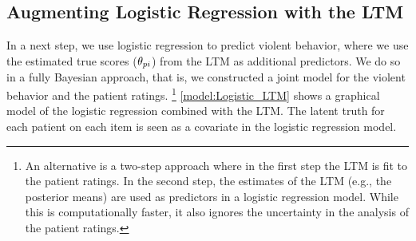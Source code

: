 \documentclass[a4paper,11pt]{article}
\begin{document}
\subsection{Augmenting Logistic Regression with the LTM}
In a next step, we use logistic regression to predict violent behavior, where we use the estimated true scores ($\theta_{pi}$) from the LTM as additional predictors.
We do so in a fully Bayesian approach, that is, we constructed a joint model for the violent behavior and the patient ratings.%
\footnote{%
An alternative is a two-step approach where in the first step the LTM is fit to the patient ratings.
In the second step, the estimates of the LTM (e.g., the posterior means) are used as predictors in a logistic regression model.
While this is computationally faster, it also ignores the uncertainty in the analysis of the patient ratings.
}
\autoref{model:Logistic_LTM} shows a graphical model of the logistic regression combined with the LTM.
The latent truth for each patient on each item is seen as a covariate in the logistic regression model.
\end{document}
